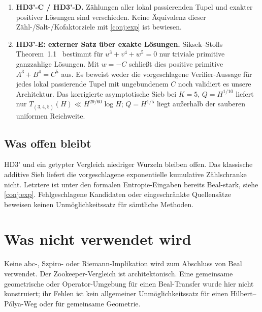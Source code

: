 \documentclass[11pt,a4paper]{article}
\begin{document}
\begin{enumerate}[leftmargin=*]
Die skalare Familie $a^x+b^y=c$ wird nach endlichem étalem Basiswechsel
$c=t^L$ auf $\mathbb G_m$, $L=\mathrm{lcm}(x,y)$, konstant:
$a=t^{L/x}u$, $b=t^{L/y}v$ reduziert auf $u^x+v^y=1$.
In Charakteristik ohne Teiler von $xy$ faktorisiert ihre geometrische
Monodromie durch eine endliche Deckgruppe; diese konkrete Familie
kann keine positivdimensionale volle symplektische Monodromiegruppe besitzen.
Keine Trivialisierung bei $c=0$, kein allgemeines Frey-Familien-No-Go
und keine Xu-Äquivalenz~\cite{Xu2020,FouvryKatz2001,KatzTwistedL} folgen.
\item \textbf{HD3'-C / HD3'-D.} Zählungen aller lokal passierenden Tupel
und exakter positiver Lösungen sind verschieden. Keine Äquivalenz
dieser Zähl-/Salt-/Kofaktorziele mit \cref{conj:exp} ist bewiesen.
\item \textbf{HD3'-E: externer Satz über exakte Lösungen.}
Siksek--Stolls Theorem~1.1~\cite{SiksekStoll2012} bestimmt für
$u^3+v^4+w^5=0$ nur triviale primitive ganzzahlige Lösungen.
Mit $w=-C$ schließt dies positive primitive $A^3+B^4=C^5$ aus.
Es beweist weder die vorgeschlagene Verifier-Aussage für jedes lokal
passierende Tupel mit ungebundenem $C$ noch validiert es unsere Architektur.
Das korrigierte asymptotische Sieb bei $K=5$, $Q=H^{1/10}$ liefert nur
$T_{(3,4,5)}(H)\ll H^{29/60}\log H$; $Q=H^{1/5}$ liegt außerhalb
der sauberen uniformen Reichweite.
\end{enumerate}

\subsection*{Was offen bleibt}
HD3' und ein getypter Vergleich niedriger Wurzeln bleiben offen.
Das klassische additive Sieb liefert die vorgeschlagene exponentielle
kumulative Zählschranke nicht. Letztere ist unter den formalen
Entropie-Eingaben bereits Beal-stark, siehe \cref{conj:exp}.
Fehlgeschlagene Kandidaten oder eingeschränkte Quellensätze beweisen
keinen Unmöglichkeitssatz für sämtliche Methoden.

\section{Was nicht verwendet wird}

Keine abc-, Szpiro- oder Riemann-Implikation wird zum Abschluss von
Beal verwendet. Der Zookeeper-Vergleich ist architektonisch.
Eine gemeinsame geometrische oder Operator-Umgebung für einen
Beal-Transfer wurde hier nicht konstruiert; ihr Fehlen ist kein
allgemeiner Unmöglichkeitssatz für einen Hilbert--Pólya-Weg oder
für gemeinsame Geometrie.
\end{document}
